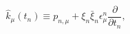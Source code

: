 \begin{equation}
\hat{k}_\mu(t_n)\equiv p_{n,\mu}+\xi_n\bar{\xi}_n\epsilon^n_\mu \frac{\partial}{\partial t_n},
\end{equation}

